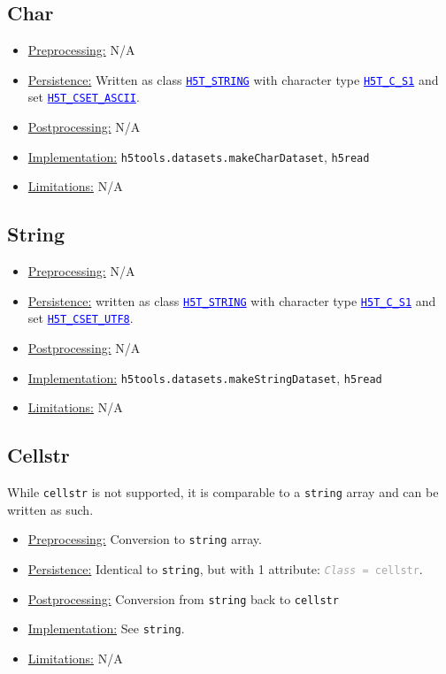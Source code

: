 \documentclass[11pt]{exam}
\newcommand\myurl[1]{\textcolor{blue}{\underline{#1}}}
\newcommand\myfcn[1]{\colorbox{codegray}{\textcolor{codeblue}{\texttt{#1}}}}
\newcommand\matfcn[1]{\textcolor{darkteal}{\texttt{#1}}}
\newcommand\hdftype[1]{\texttt{\myurl{#1}}}
\newcommand\myatt[2]{\textcolor{darkgray}{\texttt{\textit{#1} = #2}}}
\begin{document}
		\subsection{Char}
		\noindent\begin{itemize}
			\item \underline{Preprocessing:} N/A 
			\item \underline{Persistence:} Written as class \hdftype{H5T\_STRING} with character type \hdftype{H5T\_C\_S1} and set \hdftype{H5T\_CSET\_ASCII}.
			\item \underline{Postprocessing:} N/A
			\item \underline{Implementation:} \myfcn{h5tools.datasets.makeCharDataset}, \matfcn{h5read}
			\item \underline{Limitations:} N/A
		\end{itemize}

		\subsection{String}
		\noindent\begin{itemize}
			\item \underline{Preprocessing:} N/A
			\item \underline{Persistence:} written as class \hdftype{H5T\_STRING} with character type \hdftype{H5T\_C\_S1} and set \hdftype{H5T\_CSET\_UTF8}.
			\item \underline{Postprocessing:} N/A
			\item \underline{Implementation:} \myfcn{h5tools.datasets.makeStringDataset}, \matfcn{h5read}
			\item \underline{Limitations:} N/A
		\end{itemize}
		
		\subsection{Cellstr}
		\noindent While \texttt{cellstr} is not supported, it is comparable to a \texttt{string} array and can be written as such.  
		\begin{itemize}
			\item \underline{Preprocessing:} Conversion to \texttt{string} array.
			\item \underline{Persistence:} Identical to \texttt{string}, but with 1 attribute: \myatt{Class}{cellstr}.
			\item \underline{Postprocessing:} Conversion from \texttt{string} back to \texttt{cellstr}
			\item \underline{Implementation:} See \texttt{string}.
			\item \underline{Limitations:} N/A
		\end{itemize}
\end{document}
